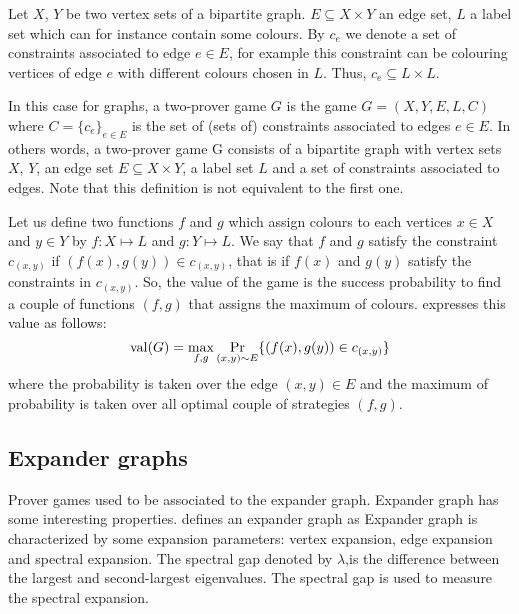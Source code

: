 Let $X$, $Y$ be two vertex sets of a bipartite graph. $E\subseteq X \times Y$ an edge set, $L$ a label set which can for instance contain some colours. By $c_e$ we denote a set of constraints associated to edge $e \in E$, for example  this constraint can be colouring vertices of edge $e$ with different colours chosen in $L$. Thus, $c_e \subseteq L \times L$.

In this case for graphs, a two-prover game $G$ is the game $G=(X,Y,E,L,C)$ where $C=\{c_e\}_{e\in E}$ is the set of (sets of) constraints associated to edges $e \in E$.
In others words, a two-prover game G consists of a bipartite graph with vertex
sets $X$, $Y$, an edge set $ E \subseteq X \times Y$, a label set $L$ and a set of constraints associated to edges. Note that this definition is not equivalent to the first one.


Let us define two functions $f$ and $g$ which assign colours to each vertices  $x \in X$ and $y \in Y$ by $f: X\longmapsto L$ and $g: Y\longmapsto L$. We say that $f$ and $g$ satisfy the constraint $c_{(x,y)}$ if $(f(x),g(y)) \in c_{(x,y)}$, that is if $f(x)$ and $g(y)$ satisfy the constraints in $c_{(x,y)}$. So, the value of the game is the success probability to find a couple of functions $(f,g)$ that assigns the maximum of colours.
\cite{tamaki2015parallel} expresses this value as follows: 
 $$\mathrm{val} (G)=\max_{f,g}\underset{(x,y)\sim E}\Pr  \{(f(x),g(y)) \in c_{(x,y)} \}$$
where the probability is taken over the edge $(x,y) \in E$ and the maximum of probability is taken over all optimal couple of strategies $(f,g).$

\subsection{Expander graphs}

Prover games used to be associated to the expander graph. Expander graph has some interesting properties. 
\cite{nielsen2005introduction} defines an expander graph as  Expander graph is characterized by some expansion parameters: vertex expansion, edge expansion and spectral expansion. The spectral gap denoted by $\lambda$,is the difference between the largest and second-largest eigenvalues. The spectral gap is used to measure the spectral expansion. 

